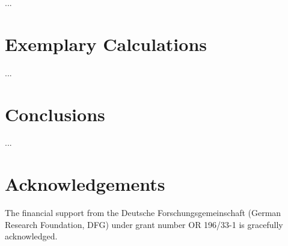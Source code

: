 \documentclass{svproc}
\begin{document}
...

\section{Exemplary Calculations}
\label{sec:Example}

...

\section{Conclusions}
\label{sec:Conclusion}


...

\section*{Acknowledgements}

The financial support from the Deutsche Forschungsgemeinschaft (German Research Foundation, DFG) under grant number OR 196/33-1 is gracefully acknowledged.



\end{document}

